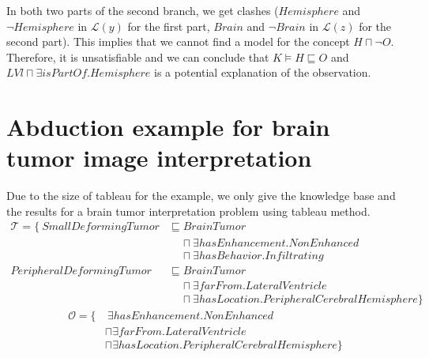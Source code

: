 \documentclass{article}
\begin{document}
\begin{center}
\end{center}

In both two parts of the second branch, we get clashes ($Hemisphere$ and $\neg Hemisphere$ in $\mathcal{L}(y)$ for the first part, $Brain$ and $\neg Brain$ in $\mathcal{L}(z)$ for the second part).
This implies that we cannot find a model for the concept $H\sqcap \neg O$. Therefore, it is unsatisfiable and we can conclude that $K\vDash H\sqsubseteq O$ and $LVl\sqcap \exists isPartOf.Hemisphere$ is a potential
explanation of the observation.

\section{Abduction example for brain tumor image interpretation}
Due to the size of tableau for the example, we only give the knowledge base and the results for a brain tumor interpretation problem using tableau method.
\begin{align*}
\mathcal{T}=\{~SmallDeformingTumor &\sqsubseteq BrainTumor\\
 &~~~~~\sqcap \exists hasEnhancement. NonEnhanced \\
&~~~~~\sqcap \exists hasBehavior. Infiltrating  \\
PeripheralDeformingTumor &\sqsubseteq BrainTumor\\
&~~~~~ \sqcap \exists farFrom. LateralVentricle \\
&~~~~~ \sqcap \exists hasLocation. PeripheralCerebralHemisphere \} 
\end{align*}\vspace{-0.9cm}
\begin{align*}
\mathcal{O} =\{&~\exists hasEnhancement. NonEnhanced \\
 &\sqcap \exists farFrom. LateralVentricle \\
&\sqcap \exists hasLocation. PeripheralCerebralHemisphere \} 
\end{align*}
\end{document}
